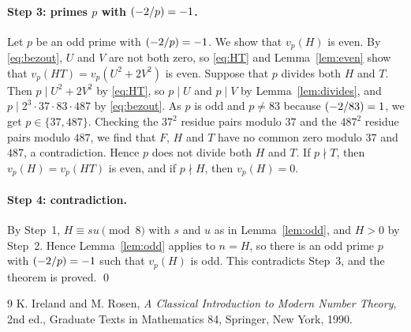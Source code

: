\documentclass[11pt]{article}
\newcommand{\leg}[2]{\mathchoice{\biggl(\dfrac{#1}{#2}\biggr)}{(#1/#2)}{(#1/#2)}{(#1/#2)}}
\begin{document}
\paragraph{\texorpdfstring{Step 3: primes $p$ with $\leg{-2}{p}=-1$.}{Step 3: inert primes.}} Let $p$ be an odd prime with $\leg{-2}{p}=-1$. We show that $v_p(H)$ is even. By \eqref{eq:bezout}, $U$ and $V$ are not both zero, so \eqref{eq:HT} and Lemma~\ref{lem:even} show that $v_p(HT)=v_p(U^2+2V^2)$ is even. Suppose that $p$ divides both $H$ and $T$. Then $p\mid U^2+2V^2$ by \eqref{eq:HT}, so $p\mid U$ and $p\mid V$ by Lemma~\ref{lem:divides}, and $p\mid 2^{3}\cdot 37\cdot 83\cdot 487$ by \eqref{eq:bezout}. As $p$ is odd and $p\neq83$ because $\leg{-2}{83}=1$, we get $p\in\{37,487\}$. Checking the $37^2$ residue pairs modulo $37$ and the $487^2$ residue pairs modulo $487$, we find that $F$, $H$ and $T$ have no common zero modulo $37$ and $487$, a contradiction. Hence $p$ does not divide both $H$ and $T$. If $p\nmid T$, then $v_p(H)=v_p(HT)$ is even, and if $p\nmid H$, then $v_p(H)=0$.

\paragraph{Step 4: contradiction.} By Step~1, $H\equiv su\pmod{8}$ with $s$ and $u$ as in Lemma~\ref{lem:odd}, and $H>0$ by Step~2. Hence Lemma~\ref{lem:odd} applies to $n=H$, so there is an odd prime $p$ with $\leg{-2}{p}=-1$ such that $v_p(H)$ is odd. This contradicts Step~3, and the theorem is proved.
\qed

\begin{thebibliography}{9}
 K. Ireland and M. Rosen, \emph{A Classical Introduction to Modern Number Theory}, 2nd ed., Graduate Texts in Mathematics 84, Springer, New York, 1990.
\end{thebibliography}
\end{document}

